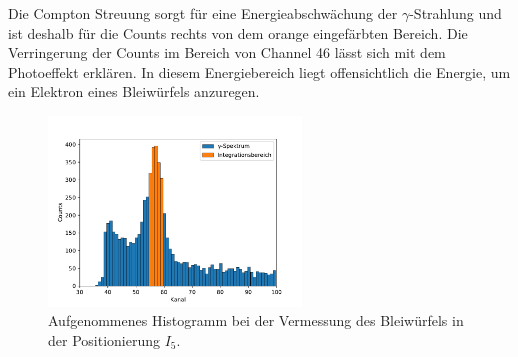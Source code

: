 Die Compton Streuung sorgt für eine Energieabschwächung der $\gamma$-Strahlung und ist deshalb für die Counts rechts von dem
orange eingefärbten Bereich. Die Verringerung der Counts im Bereich von Channel 46 lässt sich mit dem Photoeffekt erklären.
In diesem Energiebereich liegt offensichtlich die Energie, um ein Elektron eines Bleiwürfels anzuregen.  %

\begin{figure}[h]
  \centering
  \includegraphics[width=0.6\textwidth]{hist/hist.pdf}
  \caption{Aufgenommenes Histogramm bei der Vermessung des Bleiwürfels in der Positionierung $I_5$.}
  \label{fig: histo}
\end{figure}

